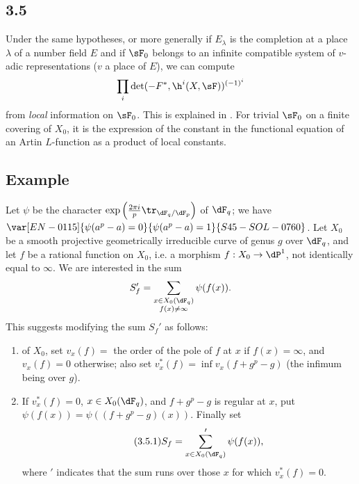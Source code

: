 \subsection*{3.5}\label{VI:3-5_} %

Under the same hypotheses, or more generally if $E_\lambda$ is the 
completion at a place $\lambda$ of a number field $E$ and if $\sF_0$ 
belongs to an infinite compatible system of $v$-adic representations 
($v$ a place of $E$), we can compute 
\[
  \prod_i \det(-F^\ast,\h^i(X,\sF))^{(-1)^i} 
\]
from \emph{local} information on $\sF_0$. This is explained in 
. For trivial $\sF_0$ on a finite covering of $X_0$, it is 
the expression of the constant in the functional equation of an Artin 
$L$-function as a product of local constants. 





\subsection{Example}\label{VI:3-5}

Let $\psi$ be the character 
$\exp\left(\frac{2\pi i}{p} \tr_{\dF_q/\dF_p}\right)$ of $\dF_q$; we have 
$\var[EN-0115]{\psi(a^p-a)=0}{\psi(a^p-a)=1}{S45-SOL-0760}$. Let $X_0$ be a smooth projective geometrically 
irreducible curve of genus $g$ over $\dF_q$, and let $f$ be a rational function on 
$X_0$, i.e. a morphism $f:X_0 \to \dP^1$, not identically equal to 
$\infty$. We are interested in the sum 
\[
  S_f' = \sum_{\substack{x\in X_0(\dF_q) \\ f(x)\ne \infty}} \psi(f(x)) 
  \text{.}
\]
 This suggests modifying 
the sum $S_f'$ as follows: 
\begin{enumerate}[\indent a)]
  \item {} of $X_0$, set $v_x(f) = $ the order of the 
    pole of $f$ at $x$ if $f(x)=\infty$, and $v_x(f)=0$ otherwise; also set 
    $v_x^\ast(f) = \inf v_x(f+g^p-g)$ (the infimum being over $g$). 
  \item If $v_x^\ast(f)=0$, $x\in X_0(\dF_q)$, and $f+g^p-g$ is 
    regular at $x$, put $\psi(f(x)) = \psi((f+g^p-g)(x))$. Finally set 
\begin{equation*}\tag{3.5.1}\label{VI:eq:3-5-1}
      S_f = \sum'_{x\in X_0(\dF_q)} \psi(f(x)) \text{,}
    \end{equation*}
    where $\prime$ indicates that the sum runs over those $x$ for which 
    $v_x^\ast(f)=0$. 
\end{enumerate}

